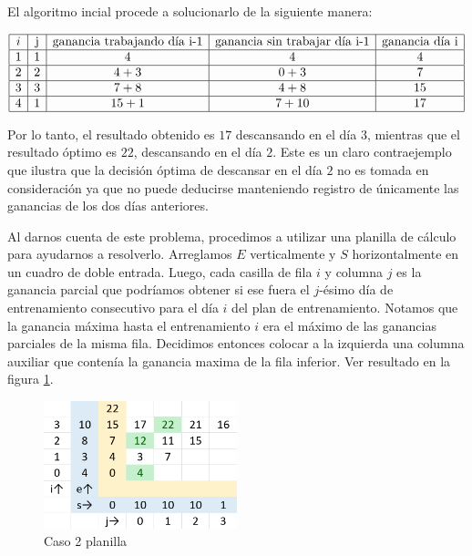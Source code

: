 El algoritmo incial 
procede a solucionarlo de la siguiente manera:

$$
\begin{array}{|c|c|c|c|c|c|}
    \hline
    i & \text{j} & \text{ganancia trabajando día i-1} & \text{ganancia sin trabajar día i-1} & \text{ganancia día i} \\
    \hline
    1 & 1 & 4 & 4 & 4 \\
    \hline
    2 & 2 & 4+3 & 0+3 & 7 \\
    \hline
    3 & 3 & 7+8 & 4+8 & 15 \\
    \hline
    4 & 1 & 15+1 & 7+10 & 17 \\
    \hline
\end{array}
$$


Por lo tanto, el resultado obtenido es $17$ descansando en el día $3$, mientras que el resultado
óptimo es $22$, descansando en el día $2$. Este es un claro contraejemplo que ilustra que la decisión
óptima de descansar en el día $2$ no es tomada en consideración ya que no puede deducirse manteniendo
registro de únicamente las ganancias de los dos días anteriores. 

Al darnos cuenta de este problema, procedimos a utilizar una planilla de cálculo para ayudarnos a resolverlo.
Arreglamos $E$ verticalmente y $S$ horizontalmente en un cuadro de doble entrada. Luego, cada
casilla de fila $i$ y columna $j$ es la ganancia parcial que podríamos obtener si ese fuera el $j$-ésimo día
de entrenamiento consecutivo para el día $i$ del plan de entrenamiento. Notamos que la ganancia
máxima hasta el entrenamiento $i$ era el máximo de las ganancias parciales de la misma fila.
Decidimos entonces colocar a la izquierda una columna auxiliar que contenía la ganancia maxima
de la fila inferior. Ver resultado en la figura \ref{fig:planilla_caso_2}.

\begin{figure}[H]
    \centering
    \includegraphics[width=0.5\textwidth]{img/planilla_caso_2.png}
    \caption{Caso 2 planilla}
    \label{fig:planilla_caso_2}
\end{figure}


